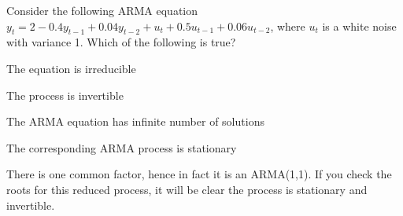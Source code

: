 
\begin{question}
Consider the following ARMA equation \(y_t= 2 - 0.4 y_{t-1} + 0.04 y_{t-2} + u_t + 0.5 u_{t-1}+ 0.06 u_{t-2}\), where \(u_t\) is a white noise with variance 1. Which of the following is true?
\begin{answerlist}
  \item The equation is irreducible
  \item The process is invertible
  \item The ARMA equation has infinite number of solutions
  \item The corresponding ARMA process is stationary
\end{answerlist}
\end{question}

\begin{solution}
There is one common factor, hence in fact it is an ARMA(1,1). If you check the roots for this reduced process, it will be clear the process is stationary and invertible.
\end{solution}

